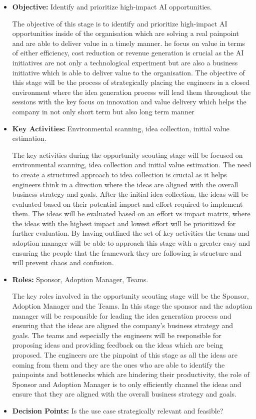 \documentclass[]{imc-inf}
\begin{document}
\begin{itemize}
	\item
	\textbf{Objective:} Identify and prioritize high-impact AI
	opportunities.
	
	The objective of this stage is to identify and prioritize high-impact
	AI opportunities inside of the organisation which are solving a real
	painpoint and are able to deliver value in a timely manner. he focus
	on value in terms of either efficiency, cost reduction or revenue
	generation is crucial as the AI initiatives are not only a
	technological experiment but are also a business initiative which is
	able to deliver value to the organisation. The objective of this stage
	will be the process of strategically placing the engineers in a closed
	environment where the idea generation process will lead them
	throughout the sessions with the key focus on innovation and value
	delivery which helps the company in not only short term but also long
	term manner
	\item
	\textbf{Key Activities:} Environmental scanning, idea collection,
	initial value estimation.
	
	The key activities during the opportunity scouting stage will be
	focused on environmental scanning, idea collection and initial value
	estimation. The need to create a structured approach to idea
	collection is crucial as it helps engineers think in a direction where
	the ideas are aligned with the overall business strategy and goals.
	After the initial idea collection, the ideas will be evaluated based
	on their potential impact and effort required to implement them. The
	ideas will be evaluated based on an effort vs impact matrix, where the
	ideas with the highest impact and lowest effort will be prioritized
	for further evaluation. By having outlined the set of key activities
	the teams and adoption manager will be able to approach this stage
	with a greater easy and ensuring the people that the framework they
	are following is structure and will prevent chaos and confusion.
	\item
	\textbf{Roles:} Sponsor, Adoption Manager, Teams.
	
	The key roles involved in the opportunity scouting stage will be the
	Sponsor, Adoption Manager and the Teams. In this stage the sponsor and
	the adoption manager will be responsible for leading the idea
	generation process and ensuring that the ideas are aligned the
	company's business strategy and goals. The teams and especially the
	engineers will be responsible for proposing ideas and providing
	feedback on the ideas which are being proposed. The engineers are the
	pinpoint of this stage as all the ideas are coming from them and they
	are the ones who are able to identify the painpoints and bottlenecks
	which are hindering their productivity, the role of Sponsor and
	Adoption Manager is to only efficiently channel the ideas and ensure
	that they are aligned with the overall business strategy and goals.
	\item
	\textbf{Decision Points:} Is the use case strategically relevant and
	feasible?
	

\end{itemize}
\end{document}
